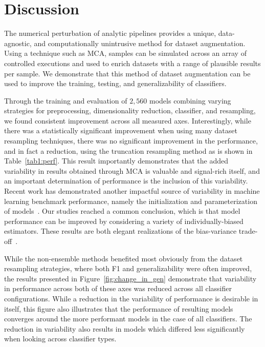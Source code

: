 \documentclass[num-refs]{nbdt-article}
\begin{document}
\section{Discussion}

The numerical perturbation of analytic pipelines provides a unique, data-agnostic, and computationally unintrusive method for dataset augmentation. Using a technique such as MCA, samples can be simulated across an array of controlled executions and used to enrich datasets with a range of plausible results per sample. We demonstrate that this method of dataset augmentation can be used to improve the training, testing, and generalizability of classifiers.

Through the training and evaluation of $2,560$ models combining varying strategies for preprocessing, dimensionality reduction, classifier, and resampling, we found consistent improvement across all measured axes. Interestingly, while there was a statistically significant improvement when using many dataset resampling techniques, there was no significant improvement in the performance, and in fact a reduction, using the truncation resampling method as is shown in Table~\ref{tab1:perf}. This result importantly demonstrates that the added variability in results obtained through MCA is valuable and signal-rich itself, and an important determination of performance is the inclusion of this variability. Recent work has demonstrated another impactful source of variability in machine learning benchmark performance, namely the initialization and parameterization of models~\cite{bouthillier2021accounting}. Our studies reached a common conclusion, which is that model performance can be improved by considering a variety of individually-biased estimators. These results are both elegant realizations of the bias-variance trade-off~\cite{geman1992neural}.

While the non-ensemble methods benefited most obviously from the dataset resampling strategies, where both F1 and generalizability were often improved, the results presented in Figure~\ref{fig:change_in_gen} demonstrate that variability in performance across both of these axes was reduced across all classifier configurations. While a reduction in the variability of performance is desirable in itself, this figure also illustrates that the performance of resulting models converges around the more performant models in the case of all classifiers. The reduction in variability also results in models which differed less significantly when looking across classifier types.
\end{document}
